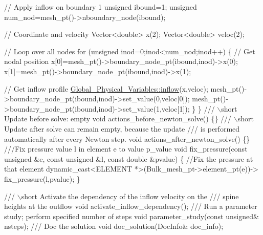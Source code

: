 \begin{DoxyCodeInclude}
   \textcolor{comment}{// Apply inflow on boundary 1}
   \textcolor{keywordtype}{unsigned} ibound=1;
   \textcolor{keywordtype}{unsigned} num\_nod=mesh\_pt()->nboundary\_node(ibound);
   
   \textcolor{comment}{// Coordinate and velocity}
   Vector<double> x(2);
   Vector<double> veloc(2);

   \textcolor{comment}{// Loop over all nodes}
   \textcolor{keywordflow}{for} (\textcolor{keywordtype}{unsigned} inod=0;inod<num\_nod;inod++)
    \{
     \textcolor{comment}{// Get nodal position}
     x[0]=mesh\_pt()->boundary\_node\_pt(ibound,inod)->x(0);
     x[1]=mesh\_pt()->boundary\_node\_pt(ibound,inod)->x(1);

     \textcolor{comment}{// Get inflow profile}
     \hyperlink{namespaceGlobal__Physical__Variables_a08e9835d71b7f7194ec5475f139211be}{Global\_Physical\_Variables::inflow}(x,veloc);
     mesh\_pt()->boundary\_node\_pt(ibound,inod)->set\_value(0,veloc[0]);
     mesh\_pt()->boundary\_node\_pt(ibound,inod)->set\_value(1,veloc[1]);
    \}
  \}
\textcolor{comment}{}
\textcolor{comment}{ /// \(\backslash\)short Update before solve: empty}
\textcolor{comment}{} \textcolor{keywordtype}{void} actions\_before\_newton\_solve() \{\}
\textcolor{comment}{}
\textcolor{comment}{ /// \(\backslash\)short Update after solve can remain empty, because the update }
\textcolor{comment}{ /// is performed automatically after every Newton step.}
\textcolor{comment}{} \textcolor{keywordtype}{void} actions\_after\_newton\_solve() \{\}
\textcolor{comment}{}
\textcolor{comment}{ ///Fix pressure value l in element e to value p\_value}
\textcolor{comment}{} \textcolor{keywordtype}{void} fix\_pressure(\textcolor{keyword}{const} \textcolor{keywordtype}{unsigned} &e, \textcolor{keyword}{const} \textcolor{keywordtype}{unsigned} &l, 
                   \textcolor{keyword}{const} \textcolor{keywordtype}{double} &pvalue)
  \{
   \textcolor{comment}{//Fix the pressure at that element}
   \textcolor{keyword}{dynamic\_cast<}ELEMENT *\textcolor{keyword}{>}(Bulk\_mesh\_pt->element\_pt(e))->
    fix\_pressure(l,pvalue);
  \}

 \textcolor{comment}{}
\textcolor{comment}{ /// \(\backslash\)short Activate the dependency of the inflow velocity on the }
\textcolor{comment}{ /// spine heights at the outflow}
\textcolor{comment}{} \textcolor{keywordtype}{void} activate\_inflow\_dependency();
\textcolor{comment}{}
\textcolor{comment}{ /// Run a parameter study; perform specified number of steps}
\textcolor{comment}{} \textcolor{keywordtype}{void} parameter\_study(\textcolor{keyword}{const} \textcolor{keywordtype}{unsigned}& nsteps); 
\textcolor{comment}{}
\textcolor{comment}{ /// Doc the solution}
\textcolor{comment}{} \textcolor{keywordtype}{void} doc\_solution(DocInfo& doc\_info);



\end{DoxyCodeInclude}
